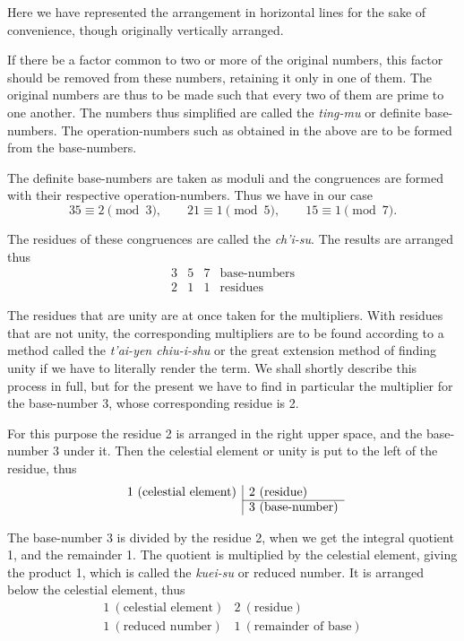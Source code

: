 \documentclass[11pt]{article}
\newcommand{\scanpage}[2]{\clearpage\setcounter{footnote}{0}\noindent{\footnotesize\color{gray}PDF page #1 · #2}\par\medskip}
\newcommand{\scanfooter}{}
\begin{document}
Here we have represented the arrangement in horizontal lines for the sake of convenience, though originally vertically arranged.
\scanfooter

\scanpage{0080}{Chapter 11, printed page 66}
If there be a factor common to two or more of the original numbers, this factor should be removed from these numbers, retaining it only in one of them. The original numbers are thus to be made such that every two of them are prime to one another. The numbers thus simplified are called the \emph{ting-mu} or definite base-numbers. The operation-numbers such as obtained in the above are to be formed from the base-numbers.

The definite base-numbers are taken as moduli and the congruences are formed with their respective operation-numbers. Thus we have in our case
\[
35\equiv2\pmod 3,\qquad 21\equiv1\pmod 5,\qquad 15\equiv1\pmod 7.
\]

The residues of these congruences are called the \emph{ch'i-su}. The results are arranged thus
\[
\begin{array}{c|c|c|l}
3&5&7&\text{base-numbers}\\ \hline
2&1&1&\text{residues}
\end{array}
\]

The residues that are unity are at once taken for the multipliers. With residues that are not unity, the corresponding multipliers are to be found according to a method called the \emph{t'ai-yen chiu-i-shu} or the great extension method of finding unity if we have to literally render the term. We shall shortly describe this process in full, but for the present we have to find in particular the multiplier for the base-number 3, whose corresponding residue is 2.

For this purpose the residue 2 is arranged in the right upper space, and the base-number 3 under it. Then the celestial element or unity is put to the left of the residue, thus
\[
\begin{array}{l|l}
1\ (\text{celestial element})&2\ (\text{residue})\\ \cline{2-2}
&3\ (\text{base-number})
\end{array}
\]

The base-number 3 is divided by the residue 2, when we get the integral quotient 1, and the remainder 1. The quotient is multiplied by the celestial element, giving the product 1, which is called the \emph{kuei-su} or reduced number. It is arranged below the celestial element, thus
\[
\begin{array}{l|l}
1\ (\text{celestial element})&2\ (\text{residue})\\ \hline
1\ (\text{reduced number})&1\ (\text{remainder of base})
\end{array}
\]
\end{document}
